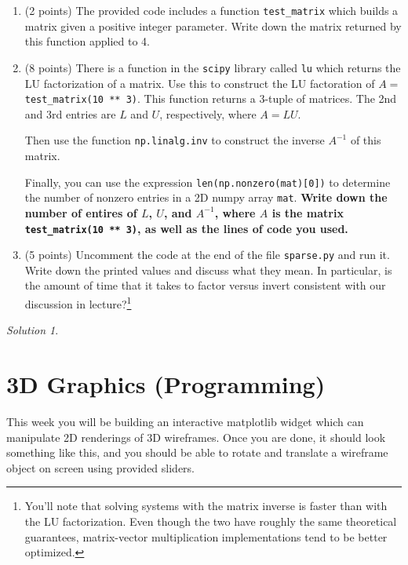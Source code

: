\documentclass{article}
\theoremstyle{remark}
\newtheorem*{solution}{Solution}
\begin{document}
\begin{enumerate}
\item (2 points) The provided code includes a function \texttt{test\_matrix} which builds a matrix given a positive integer parameter. Write down the matrix returned by this function applied to 4.

\item (8 points) There is a function in the \texttt{scipy} library called \texttt{lu} which returns the LU factorization of a matrix.
  Use this to construct the LU factoration of $A = $ \texttt{test\_matrix(10 ** 3)}.
  This function returns a 3-tuple of matrices.
  The 2nd and 3rd entries are $L$ and $U$, respectively, where $A = LU$.

  Then use the function \texttt{np.linalg.inv} to construct the inverse $A^{-1}$ of this matrix.

  Finally, you can use the expression \texttt{len(np.nonzero(mat)[0])} to determine the number of nonzero entries in a 2D numpy array \texttt{mat}.
  \textbf{Write down the number of entires of $L$, $U$, and $A^{-1}$, where $A$ is the matrix \texttt{test\_matrix(10 ** 3)}, as well as the lines of code you used.}
\item (5 points)
  Uncomment the code at the end of the file \texttt{sparse.py} and run it.
  Write down the printed values and discuss what they mean.
  In particular, is the amount of time that it takes to factor versus invert consistent with our discussion in lecture?\footnote{You'll note that solving systems with the matrix inverse is faster than with the LU factorization. Even though the two have roughly the same theoretical guarantees, matrix-vector multiplication implementations tend to be better optimized.}
\end{enumerate}

\medskip

\begin{solution}
\end{solution}

\vfill

\pagebreak
\section{3D Graphics (Programming)}

\medskip

This week you will be building an interactive matplotlib widget which can manipulate 2D renderings of 3D wireframes.
Once you are done, it should look something like this, and you should be able to rotate and translate a wireframe object on screen using provided sliders.
\end{document}
